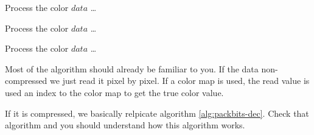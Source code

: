   \begin{algorithm}[H]
    \caption{Reading the color data of a TGA file.}
    \label{alg:TGA-read-colordata}
    \newcommand{\process}{\State Process the color $data$ \dots}
    \begin{algorithmic}[1]




            \EndIf


              \process


            \EndRepeatn

          \Else



              \EndIf

              \process


            \EndRepeatn

          \EndIf
        \Else


          \EndIf

          \process


        \EndIf
      \EndWhile
    \end{algorithmic}
  \end{algorithm}

  Most of the algorithm should already be familiar to you. If the data
  non-compressed we just read it pixel by pixel. If a color map is
  used, the read value is used an index to the color map to get the
  true color value.

  If it is compressed, we basically relpicate algorithm
  \ref{alg:packbits-dec}. Check that algorithm and you should
  understand how this algorithm works.

